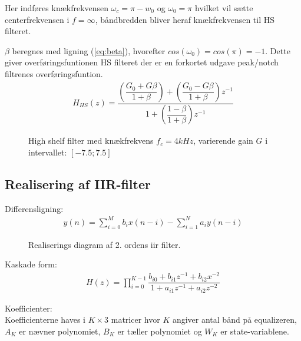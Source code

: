      Her indføres knækfrekvensen $\omega_c = \pi - w_0$ og $\omega_0 = \pi$ hvilket vil sætte centerfrekvensen i $f = \infty$, båndbredden bliver heraf knækfrekvensen 
     til HS filteret.

     $\beta$ beregnes med ligning (\ref{eq:beta}), hvorefter $cos(\omega_0) = cos(\pi) = -1$. Dette giver overføringsfuntionen HS filteret 
     der er en forkortet udgave peak/notch filtrenes overføringsfuntion.
     \begin{align}
     H_{HS}(z) =     \dfrac{\left(\dfrac{G_0 + G \beta}{1 + \beta} \right) + \left(\dfrac{ G_0 - G \beta}{1 + \beta }\right) z^{-1}}{1  + \left( \dfrac{1 - \beta}{1 + \beta} \right) z^{-1}}
     \end{align}


  \begin{figure}[H]
    \centering
        
        \caption{High shelf filter med knækfrekvens $f_c = 4kHz$, varierende gain $G$ i intervallet: $[-7.5 ; 7.5]$}
    \end{figure}  


 
  
 



 
    \subsection{Realisering af IIR-filter}

    Differensligning:
    \begin{align}
    y(n) = \sum\limits_{i=0}^{M} b_i x(n-i) - \sum\limits_{i=1}^N a_i y(n-i)
    \end{align}

    \begin{figure}[h]
        \centering
        
        \caption{Realiserings diagram af 2. ordens iir filter. }    
    \end{figure}

  

Kaskade form:\\

    
   \begin{align}
   H(z) = \prod\limits_{i=0}^{K-1} \dfrac{b_{i0} + b_{i1} z^{-1} + b_{i2} x^{-2}}{1 + a_{i1} z^{-1} + a_{i2} z^{-2}} 
   \end{align}


   Koefficienter:\\
   Koefficienterne haves i $K \times 3$ matricer hvor $K$ angiver antal bånd på equalizeren,
    $A_K$ er nævner polynomiet, $B_K$ er tæller polynomiet
   og $W_K$ er state-variablene.  


